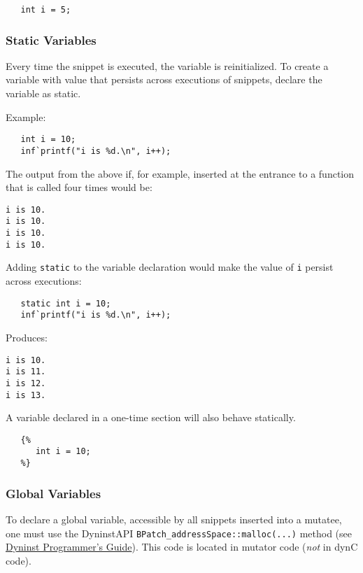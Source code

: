 \documentclass{article}
\begin{document}
\begin{lstlisting}
   int i = 5;
\end{lstlisting}

\subsubsection{Static Variables}

Every time the snippet is executed, the variable is reinitialized. To create a variable with value that persists across executions of snippets, declare the variable as static. 

\noindent Example: 
\begin{lstlisting}
   int i = 10;
   inf`printf("i is %d.\n", i++);
\end{lstlisting}

\noindent The output from the above if, for example, inserted at the entrance to a function that is called four times would be:

\begin{lstlisting}
i is 10.
i is 10.
i is 10.
i is 10.
\end{lstlisting}

\noindent Adding \verb!static! to the variable declaration would make the value of \verb!i! persist across executions:
\begin{lstlisting}
   static int i = 10;
   inf`printf("i is %d.\n", i++);
\end{lstlisting}
\noindent Produces:
\begin{lstlisting}
i is 10.
i is 11.
i is 12.
i is 13.
\end{lstlisting}

\noindent A variable declared in a one-time section will also behave statically.

\begin{lstlisting}
   {%
      int i = 10;
   %}
\end{lstlisting}


\subsubsection{Global Variables}
To declare a global variable, accessible by all snippets inserted into a mutatee, one must use the DyninstAPI \hspace{1pt} \verb!BPatch_addressSpace::malloc(...)! method (see \underline{Dyninst Programmer's Guide}). This code is located in mutator code (\emph{not} in dynC code).
\end{document}
